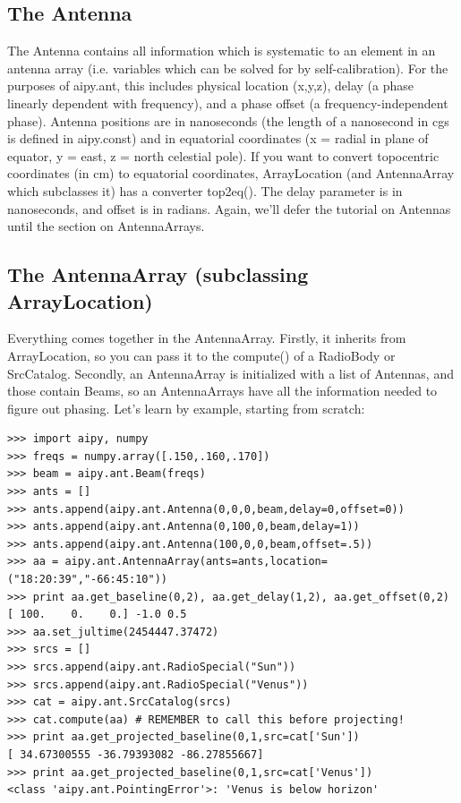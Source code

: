 \subsection{The Antenna}

The Antenna contains all information which is systematic to an element in
an antenna array (i.e. variables which can be solved for by self-calibration).
For the purposes of aipy.ant, this includes physical location (x,y,z),
delay (a phase linearly dependent with frequency), and a phase offset 
(a frequency-independent phase).  Antenna positions are in
nanoseconds (the length of a nanosecond in cgs is defined in aipy.const)
and in equatorial coordinates (x = radial in plane of equator,
y = east, z = north celestial pole).  If you want to convert topocentric
coordinates (in cm) to equatorial coordinates, ArrayLocation (and
AntennaArray which subclasses it) has a converter top2eq().  The delay
parameter is in nanoseconds, and offset is in radians.  Again, we'll
defer the tutorial on Antennas until the section on AntennaArrays.

\subsection{The AntennaArray (subclassing ArrayLocation)}

Everything comes together in the AntennaArray.  Firstly, it inherits from
ArrayLocation, so you can pass it to the compute() of a RadioBody or
SrcCatalog.  Secondly, an AntennaArray is initialized with a list of
Antennas, and those contain Beams, so an AntennaArrays have all the information
needed to figure out phasing.  Let's learn by example, starting from scratch:

\begin{verbatim}
>>> import aipy, numpy
>>> freqs = numpy.array([.150,.160,.170])
>>> beam = aipy.ant.Beam(freqs)
>>> ants = []
>>> ants.append(aipy.ant.Antenna(0,0,0,beam,delay=0,offset=0))
>>> ants.append(aipy.ant.Antenna(0,100,0,beam,delay=1))
>>> ants.append(aipy.ant.Antenna(100,0,0,beam,offset=.5))
>>> aa = aipy.ant.AntennaArray(ants=ants,location=("18:20:39","-66:45:10"))
>>> print aa.get_baseline(0,2), aa.get_delay(1,2), aa.get_offset(0,2)
[ 100.    0.    0.] -1.0 0.5
>>> aa.set_jultime(2454447.37472)
>>> srcs = []
>>> srcs.append(aipy.ant.RadioSpecial("Sun"))
>>> srcs.append(aipy.ant.RadioSpecial("Venus"))
>>> cat = aipy.ant.SrcCatalog(srcs)
>>> cat.compute(aa) # REMEMBER to call this before projecting!
>>> print aa.get_projected_baseline(0,1,src=cat['Sun'])
[ 34.67300555 -36.79393082 -86.27855667]
>>> print aa.get_projected_baseline(0,1,src=cat['Venus'])
<class 'aipy.ant.PointingError'>: 'Venus is below horizon'
\end{verbatim}

